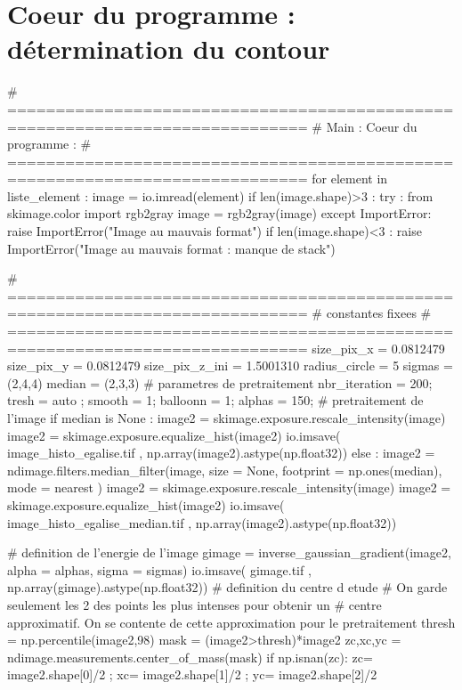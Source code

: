 		\section{Coeur du programme : détermination du contour } 
		\label{chap_annexe:code_determination_contour}  
		\begin{customFrame}
# =============================================================================
# Main : Coeur du programme : 
# =============================================================================
for element in liste_element : 
    image = io.imread(element)     
    if len(image.shape)>3 :
        try :
            from skimage.color import rgb2gray
            image = rgb2gray(image)
        except ImportError:
            raise ImportError("Image au mauvais format") 
    if len(image.shape)<3 :
            raise ImportError("Image au mauvais format : manque de stack") 

# =============================================================================
# constantes fixees
# =============================================================================          
size_pix_x = 0.0812479
size_pix_y = 0.0812479
size_pix_z_ini = 1.5001310
radius_circle = 5  
sigmas = (2,4,4)
median = (2,3,3)
# parametres de pretraitement       
 nbr_iteration = 200; tresh =  auto ; smooth = 1; balloonn = 1; alphas = 150;
# pretraitement de l'image   
    if median is None : 
        image2 = skimage.exposure.rescale_intensity(image)    
        image2 = skimage.exposure.equalize_hist(image2)
        io.imsave( image_histo_egalise.tif , np.array(image2).astype(np.float32))
    else :    
        image2 = ndimage.filters.median_filter(image, size = None, footprint = np.ones(median), mode =  nearest )
        image2 = skimage.exposure.rescale_intensity(image)                     
        image2 = skimage.exposure.equalize_hist(image2)
        io.imsave( image_histo_egalise_median.tif , np.array(image2).astype(np.float32))
   
    # definition de l'energie de l'image
    gimage = inverse_gaussian_gradient(image2, alpha = alphas, sigma = sigmas)
    io.imsave( gimage.tif , np.array(gimage).astype(np.float32))        
    # definition du centre d etude
    # On garde seulement les 2 des points les plus intenses pour obtenir un 
    # centre approximatif. On se contente de cette approximation pour le pretraitement 
    thresh = np.percentile(image2,98)
    mask = (image2>thresh)*image2       
    zc,xc,yc = ndimage.measurements.center_of_mass(mask)
    if np.isnan(zc):
        zc= image2.shape[0]/2 ; xc= image2.shape[1]/2 ; yc= image2.shape[2]/2


\end{customFrame}
